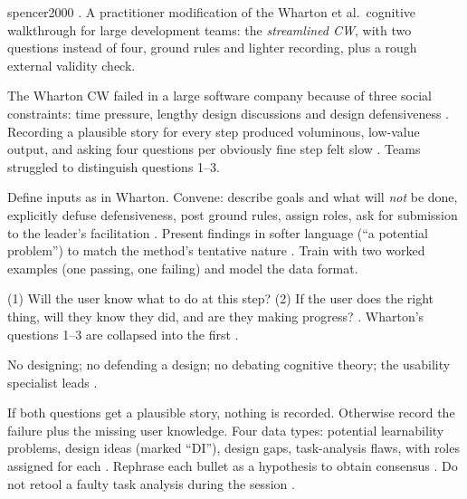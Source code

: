 \begin{papercard}{spencer2000}
 . A practitioner modification of the Wharton et al.\ cognitive walkthrough for large development teams: the \emph{streamlined CW}, with two questions instead of four, ground rules and lighter recording, plus a rough external validity check.

 The Wharton CW failed in a large software company because of three social constraints: time pressure, lengthy design discussions and design defensiveness . Recording a plausible story for every step produced voluminous, low-value output, and asking four questions per obviously fine step felt slow . Teams struggled to distinguish questions 1--3.

 Define inputs as in Wharton. Convene: describe goals and what will \emph{not} be done, explicitly defuse defensiveness, post ground rules, assign roles, ask for submission to the leader's facilitation . Present findings in softer language (``a potential problem'') to match the method's tentative nature . Train with two worked examples (one passing, one failing) and model the data format.

 (1) Will the user know what to do at this step? (2) If the user does the right thing, will they know they did, and are they making progress? . Wharton's questions 1--3 are collapsed into the first .

 No designing; no defending a design; no debating cognitive theory; the usability specialist leads .

 If both questions get a plausible story, nothing is recorded. Otherwise record the failure plus the missing user knowledge. Four data types: potential learnability problems, design ideas (marked ``DI''), design gaps, task-analysis flaws, with roles assigned for each . Rephrase each bullet as a hypothesis to obtain consensus . Do not retool a faulty task analysis during the session .


\end{papercard}
